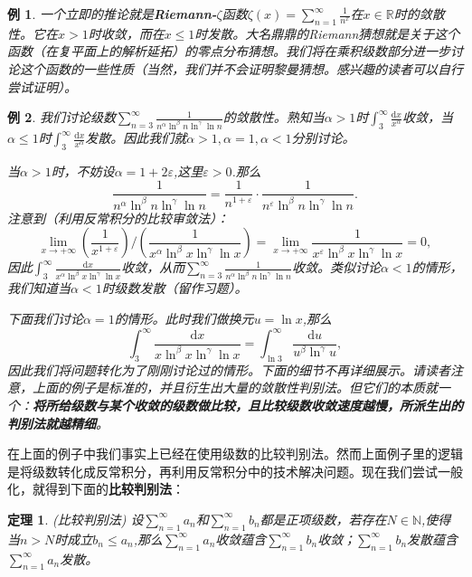\documentclass{article}
\newtheorem{theorem}{定理}[subsection]
\newtheorem{example}{例}[subsection]
\begin{document}
\begin{example}
一个立即的推论就是\textbf{Riemann-$\zeta$}函数$\zeta(x)=\sum_{n=1}^\infty\frac{1}{n^x}$在$x\in\mathbb{R}$时的敛散性。它在$x>1$时收敛，而在$x\le 1$时发散。大名鼎鼎的Riemann猜想就是关于这个函数（在复平面上的解析延拓）的零点分布猜想。我们将在乘积级数部分进一步讨论这个函数的一些性质（当然，我们并不会证明黎曼猜想。感兴趣的读者可以自行尝试证明）。
\end{example}
\begin{example}
我们讨论级数$\sum_{n=3}^{\infty}{\frac{1}{n^{\alpha}\ln ^{\beta}n\ln ^{\gamma}\ln n}}$的敛散性。熟知当$\alpha>1$时$\int_3^{\infty}{\frac{\mathrm{d}x}{x^{\alpha}}}$收敛，当$\alpha\le 1$时$\int_3^{\infty}{\frac{\mathrm{d}x}{x^{\alpha}}}$发散。因此我们就$\alpha>1,\alpha=1,\alpha<1$分别讨论。\par
当$\alpha>1$时，不妨设$\alpha=1+2\varepsilon$,这里$\varepsilon>0$.那么
$$
\frac{1}{n^{\alpha}\ln ^{\beta}n\ln ^{\gamma}\ln n}=\frac{1}{n^{1+\varepsilon}}\cdot \frac{1}{n^{\varepsilon}\ln ^{\beta}n\ln ^{\gamma}\ln n}.
$$
注意到（利用反常积分的比较审敛法）：
$$
\lim_{x\rightarrow +\infty} {{\left( \frac{1}{x^{1+\varepsilon}} \right)}\Bigg/{\left( \frac{1}{x^{\alpha}\ln ^{\beta}x\ln ^{\gamma}\ln x} \right)}}=\lim_{x\rightarrow +\infty} \frac{1}{x^{\varepsilon}\ln ^{\beta}x\ln ^{\gamma}\ln x}=0,
$$
因此$\int_3^{\infty}{\frac{\mathrm{d}x}{x^{\alpha}\ln ^{\beta}x\ln ^{\gamma}\ln x}}$收敛，从而$\sum_{n=3}^{\infty}{\frac{1}{n^{\alpha}\ln ^{\beta}n\ln ^{\gamma}\ln n}}$收敛。类似讨论$\alpha<1$的情形，我们知道当$\alpha<1$时级数发散（留作习题）。\par
下面我们讨论$\alpha=1$的情形。此时我们做换元$u=\ln x$,那么
$$
\int_3^{\infty}{\frac{\mathrm{d}x}{x\ln ^{\beta}x\ln ^{\gamma}\ln x}}=\int_{\ln 3}^{\infty}{\frac{\mathrm{d}u}{u^{\beta}\ln ^{\gamma}u}},
$$
因此我们将问题转化为了刚刚讨论过的情形。下面的细节不再详细展示。请读者注意，上面的例子是标准的，并且衍生出大量的敛散性判别法。但它们的本质就一个：\textbf{将所给级数与某个收敛的级数做比较，且比较级数收敛速度越慢，所派生出的判别法就越精细}。
\end{example}
在上面的例子中我们事实上已经在使用级数的比较判别法。然而上面例子里的逻辑是将级数转化成反常积分，再利用反常积分中的技术解决问题。现在我们尝试一般化，就得到下面的\textbf{比较判别法}：
\begin{theorem}(比较判别法)
设$\sum_{n=1}^\infty a_n$和$\sum_{n=1}^\infty b_n$都是正项级数，若存在$N\in\mathbb{N}$,使得当$n>N$时成立$b_n\le a_n$,那么$\sum_{n=1}^\infty a_n$收敛蕴含$\sum_{n=1}^\infty b_n$收敛；$\sum_{n=1}^\infty b_n$发散蕴含$\sum_{n=1}^\infty a_n$发散。
\end{theorem}
\end{document}
